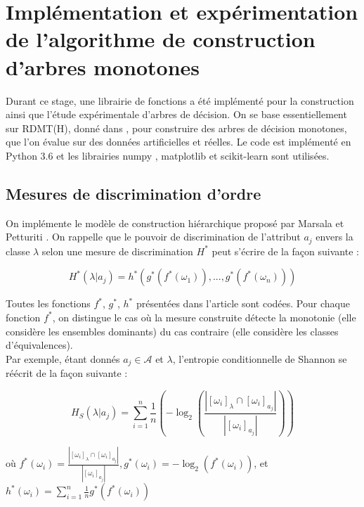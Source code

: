 \documentclass[a4paper]{article}
\begin{document}
\section{Implémentation et expérimentation de l'algorithme de construction
d'arbres monotones} 

Durant ce stage, une librairie de fonctions a été implémenté pour la construction
ainsi que l'étude expérimentale d'arbres de décision.  On se base
essentiellement sur RDMT(H), donné dans \cite{marsala-rank}, pour construire des
arbres de décision monotones, que l'on évalue sur des données artificielles et
réelles. Le code est implémenté en Python 3.6 et les librairies numpy
\cite{walt-numpy}, matplotlib \cite{hunter-matplotlib} et scikit-learn
\cite{scikit-learn} sont utilisées.

\subsection{Mesures de discrimination d'ordre} 

On implémente le modèle de construction hiérarchique proposé par Marsala et
Petturiti \cite{marsala-rank}. On rappelle que le pouvoir de discrimination de
l'attribut $a_j$ envers la classe $\lambda$ selon une mesure de discrimination
$H^*$ peut s'écrire de la façon suivante :

$$ H^*(\lambda | a_j) = h^*(g^*(f^*(\omega_1)),...,g^*(f^*(\omega_n)))$$

\noindent Toutes les fonctions $f^*$, $g^*$, $h^*$ présentées dans l'article
sont codées.  Pour chaque fonction $f^*$, on distingue le cas où la mesure
construite détecte la monotonie (elle considère les ensembles dominants) du
cas contraire (elle considère les classes d'équivalences). \\

Par exemple, étant donnés $a_j \in \mathcal{A}$ et $\lambda$, l'entropie
conditionnelle de Shannon se réécrit de la façon suivante :

\begin{equation}
    H_S(\lambda | a_j) = \sum_{i=1}^{n} \frac{1}{n} (-\log_{2}
    (\frac{|[\omega_i]_{\lambda} \cap [\omega_i]_{a_j}|}{|[\omega_i]_{a_j}|}))
\label{eq:shannon}
\end{equation}


où $f^*(\omega_i) = \frac{|[\omega_i]_{\lambda} \cap
[\omega_i]_{a_j}|}{|[\omega_i]_{a_j}|}, g^*(\omega_i) = -\log_{2}
(f^*(\omega_i))$, et $h^*(\omega_i) = \sum_{i=1}^{n} \frac{1}{n}
g^*(f^*(\omega_i))$ \\
\end{document}
